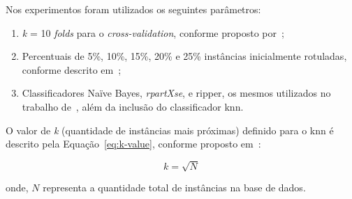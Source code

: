     Nos experimentos foram utilizados os seguintes parâmetros: 
    
    \begin{enumerate}[label=\roman*.]
        \item \textit{k} = 10 \textit{folds} para o \textit{cross\hyp{validation}}, conforme proposto por~\cite{kohavi1995study, braga2004cross, fushiki2011cross, wong2015cross};
        \item Percentuais de 5\%, 10\%, 15\%, 20\% e 25\% instâncias inicialmente rotuladas, conforme descrito em~\cite{vale2018selftraining};
        \item Classificadores Na\"ive Bayes, \textit{rpartXse}, e \ac{ripper}, os mesmos utilizados no trabalho de~\cite{vale2018selftraining}, além da inclusão do classificador \ac{knn}.
    \end{enumerate}
    
    O valor de \textit{k} (quantidade de instâncias mais próximas) definido para o \ac{knn} é descrito pela Equação~\ref{eq:k-value}, conforme proposto em~\cite{bhattacharya2012knnvalue}:
    
    \begin{equation}
        \label{eq:k-value}
        k = \sqrt{N}
    \end{equation}

    \noindent
    onde, $N$ representa a quantidade total de instâncias na base de dados.
